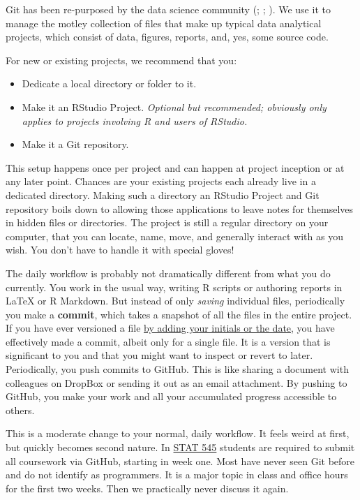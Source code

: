 \documentclass[
]{book}
\providecommand{\tightlist}{%
  \setlength{\itemsep}{0pt}\setlength{\parskip}{0pt}}
\begin{document}
Git has been re-purposed by the data science community (; ; ). We use it to manage the motley collection of files that make up typical data analytical projects, which consist of data, figures, reports, and, yes, some source code.

For new or existing projects, we recommend that you:

\begin{itemize}
\tightlist
\item
  Dedicate a local directory or folder to it.
\item
  Make it an RStudio Project. \emph{Optional but recommended; obviously only applies to projects involving R and users of RStudio.}
\item
  Make it a Git repository.
\end{itemize}

This setup happens once per project and can happen at project inception or at any later point. Chances are your existing projects each already live in a dedicated directory. Making such a directory an RStudio Project and Git repository boils down to allowing those applications to leave notes for themselves in hidden files or directories. The project is still a regular directory on your computer, that you can locate, name, move, and generally interact with as you wish. You don't have to handle it with special gloves!

The daily workflow is probably not dramatically different from what you do currently. You work in the usual way, writing R scripts or authoring reports in LaTeX or R Markdown. But instead of only \emph{saving} individual files, periodically you make a \textbf{commit}, which takes a snapshot of all the files in the entire project. If you have ever versioned a file \href{http://www.phdcomics.com/comics/archive.php?comicid=1531}{by adding your initials or the date}, you have effectively made a commit, albeit only for a single file. It is a version that is significant to you and that you might want to inspect or revert to later. Periodically, you push commits to GitHub. This is like sharing a document with colleagues on DropBox or sending it out as an email attachment. By pushing to GitHub, you make your work and all your accumulated progress accessible to others.

This is a moderate change to your normal, daily workflow. It feels weird at first, but quickly becomes second nature. In \href{http://stat545.com}{STAT 545} students are required to submit all coursework via GitHub, starting in week one. Most have never seen Git before and do not identify as programmers. It is a major topic in class and office hours for the first two weeks. Then we practically never discuss it again.
\end{document}
